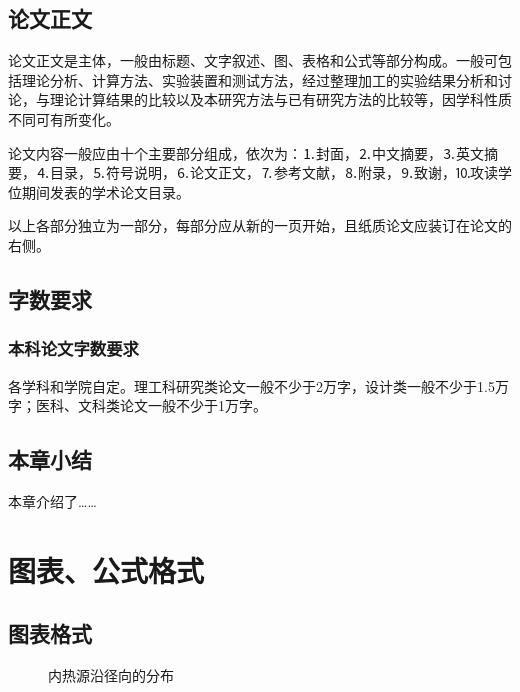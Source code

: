 \documentclass[UTF8,a4paper,12pt]{ctexart}
\numberwithin{equation}{section}
\begin{document}
\subsection{论文正文}
论文正文是主体，一般由标题、文字叙述、图、表格和公式等部分构成。一般可包括理论分析、计算方法、实验装置和测试方法，经过整理加工的实验结果分析和讨论，与理论计算结果的比较以及本研究方法与已有研究方法的比较等，因学科性质不同可有所变化。\par
论文内容一般应由十个主要部分组成，依次为：⒈封面，⒉中文摘要，⒊英文摘要，⒋目录，⒌符号说明，⒍论文正文，⒎参考文献，⒏附录，⒐致谢，⒑攻读学位期间发表的学术论文目录。\par
以上各部分独立为一部分，每部分应从新的一页开始，且纸质论文应装订在论文的右侧。\par
\subsection{字数要求}
\subsubsection{本科论文字数要求}
各学科和学院自定。理工科研究类论文一般不少于2万字，设计类一般不少于1.5万字；医科、文科类论文一般不少于1万字。

\subsection{本章小结}
本章介绍了……

\newpage
{}
\section{图表、公式格式}
\subsection{图表格式}

\begin{figure}[htb] 
\caption{内热源沿径向的分布}
\end{figure}
\end{document}
